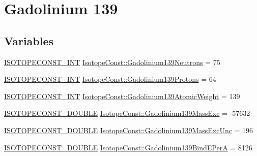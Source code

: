 \hypertarget{group___isotope_const-_gadolinium-_gd139}{}\section{Gadolinium 139}
\label{group___isotope_const-_gadolinium-_gd139}
\subsection*{Variables}
\begin{DoxyCompactItemize}
\item 
\mbox{\hyperlink{group___isotope_const-_macros_ga5f18360b3e99483a35c32d789e62621c}{I\+S\+O\+T\+O\+P\+E\+C\+O\+N\+S\+T\+\_\+\+I\+NT}} \mbox{\hyperlink{group___isotope_const-_gadolinium-_gd139_ga88bde18dd7011a6f496331f9719220d3}{Isotope\+Const\+::\+Gadolinium139\+Neutrons}} = 75
\item 
\mbox{\hyperlink{group___isotope_const-_macros_ga5f18360b3e99483a35c32d789e62621c}{I\+S\+O\+T\+O\+P\+E\+C\+O\+N\+S\+T\+\_\+\+I\+NT}} \mbox{\hyperlink{group___isotope_const-_gadolinium-_gd139_gac19b1cc775eabe3d7a6cb94c4c9da8cb}{Isotope\+Const\+::\+Gadolinium139\+Protons}} = 64
\item 
\mbox{\hyperlink{group___isotope_const-_macros_ga5f18360b3e99483a35c32d789e62621c}{I\+S\+O\+T\+O\+P\+E\+C\+O\+N\+S\+T\+\_\+\+I\+NT}} \mbox{\hyperlink{group___isotope_const-_gadolinium-_gd139_gaae6bdb0ebaf6646b96fb95a7edf3ca5c}{Isotope\+Const\+::\+Gadolinium139\+Atomic\+Weight}} = 139
\item 
\mbox{\hyperlink{group___isotope_const-_macros_ga8f45a7272ce02c0b4c65c44636ed719a}{I\+S\+O\+T\+O\+P\+E\+C\+O\+N\+S\+T\+\_\+\+D\+O\+U\+B\+LE}} \mbox{\hyperlink{group___isotope_const-_gadolinium-_gd139_gac3ab76acd3b2954f8ef60635ffe786d0}{Isotope\+Const\+::\+Gadolinium139\+Mass\+Exc}} = -\/57632
\item 
\mbox{\hyperlink{group___isotope_const-_macros_ga8f45a7272ce02c0b4c65c44636ed719a}{I\+S\+O\+T\+O\+P\+E\+C\+O\+N\+S\+T\+\_\+\+D\+O\+U\+B\+LE}} \mbox{\hyperlink{group___isotope_const-_gadolinium-_gd139_ga205fc0ee9566e4fbbcf188ac9340db13}{Isotope\+Const\+::\+Gadolinium139\+Mass\+Exc\+Unc}} = 196
\item 
\mbox{\hyperlink{group___isotope_const-_macros_ga8f45a7272ce02c0b4c65c44636ed719a}{I\+S\+O\+T\+O\+P\+E\+C\+O\+N\+S\+T\+\_\+\+D\+O\+U\+B\+LE}} \mbox{\hyperlink{group___isotope_const-_gadolinium-_gd139_gadf91438aa40e0f6b8648d8df0bec23e0}{Isotope\+Const\+::\+Gadolinium139\+Bind\+E\+PerA}} = 8126
\item 

\end{DoxyCompactItemize}
